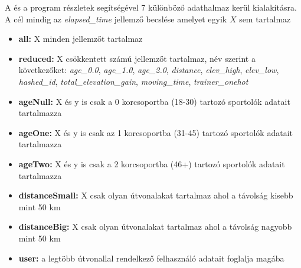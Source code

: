 A  és a  program részletek segítségével 7 különböző adathalmaz kerül kialakításra. A cél mindig az \textit{elapsed\_time} jellemző becslése amelyet egyik $X$ sem tartalmaz
\begin{itemize}
	\item \textbf{all:} X minden jellemzőt tartalmaz 
	\item \textbf{reduced:} X csökkentett számú jellemzőt tartalmaz, név szerint a következőket: \textit{age\_0.0}, \textit{age\_1.0}, \textit{age\_2.0}, \textit{distance}, \textit{elev\_high}, \textit{elev\_low}, \textit{hashed\_id}, \textit{total\_elevation\_gain}, \textit{moving\_time}, \textit{trainer\_onehot}
	\item \textbf{ageNull:} X és y is csak a 0 korcsoportba (18-30) tartozó sportolók adatait tartalmazza 
	\item \textbf{ageOne:} X és y is csak az 1 korcsoportba (31-45) tartozó sportolók adatait tartalmazza
	\item \textbf{ageTwo:} X és y is csak a 2 korcsoportba (46+) tartozó sportolók adatait tartalmazza
	\item \textbf{distanceSmall:} X csak olyan útvonalakat tartalmaz ahol a távolság kisebb mint 50 km
	\item \textbf{distanceBig:} X csak olyan útvonalakat tartalmaz ahol a távolság nagyobb mint 50 km
	\item \textbf{user:} a legtöbb útvonallal rendelkező felhasználó adatait foglalja magába
	
\end{itemize}


